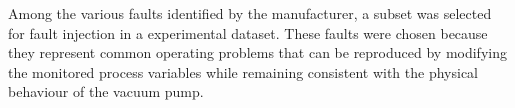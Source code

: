 Among the various faults identified by the manufacturer, a subset was selected for fault injection in a experimental dataset. These faults were chosen because 
they represent common operating problems that can be reproduced by modifying the monitored process variables while remaining consistent with the physical behaviour 
of the vacuum pump.